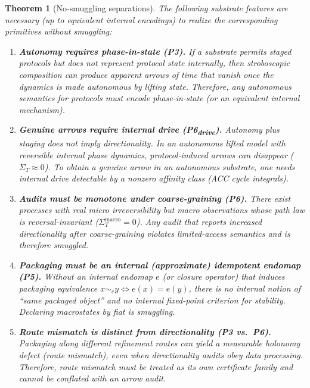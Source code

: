 \documentclass[11pt]{article}
\newtheorem{theorem}{Theorem}[section]
\theoremstyle{definition}
\theoremstyle{remark}
\begin{document}
\begin{theorem}[No-smuggling separations]
\label{thm:minimality}
The following substrate features are necessary (up to equivalent internal encodings) to realize the corresponding primitives without smuggling:
\begin{enumerate}[leftmargin=*, itemsep=0.35em]
  \item \textbf{Autonomy requires phase-in-state (P3).}
  If a substrate permits staged protocols but does not represent protocol state internally, then stroboscopic composition can produce apparent arrows of time that vanish once the dynamics is made autonomous by lifting state.
  Therefore, any autonomous semantics for protocols must encode phase-in-state (or an equivalent internal mechanism).
  \item \textbf{Genuine arrows require internal drive (P6\textsubscript{drive}).}
  Autonomy plus staging does not imply directionality.
  In an autonomous lifted model with reversible internal phase dynamics, protocol-induced arrows can disappear ($\Sigma_T\approx 0$).
  To obtain a genuine arrow in an autonomous substrate, one needs internal drive detectable by a nonzero affinity class (ACC cycle integrals).
  \item \textbf{Audits must be monotone under coarse-graining (P6).}
  There exist processes with real micro irreversibility but macro observations whose path law is reversal-invariant ($\Sigma_T^{\mathrm{macro}}=0$).
  Any audit that reports increased directionality after coarse-graining violates limited-access semantics and is therefore smuggled.
  \item \textbf{Packaging must be an internal (approximate) idempotent endomap (P5).}
  Without an internal endomap $e$ (or closure operator) that induces packaging equivalence $x\sim_e y\iff e(x)=e(y)$, there is no internal notion of ``same packaged object'' and no internal fixed-point criterion for stability.
  Declaring macrostates by fiat is smuggling.
  \item \textbf{Route mismatch is distinct from directionality (P3 vs.\ P6).}
  Packaging along different refinement routes can yield a measurable holonomy defect (route mismatch), even when directionality audits obey data processing.
  Therefore, route mismatch must be treated as its own certificate family and cannot be conflated with an arrow audit.
\end{enumerate}
\end{theorem}
\end{document}
